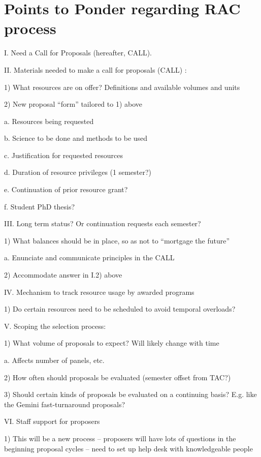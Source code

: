 \section{Points to Ponder regarding RAC process}


I.	Need a Call for Proposals (hereafter, CALL). 

II.	Materials needed to make a call for proposals (CALL) :


1)	What resources are on offer?  Definitions and available volumes and units


2)	New proposal “form” tailored to 1) above


a.	Resources being requested


b.	Science to be done  and methods to be used


c.	Justification for requested resources


d.	Duration of resource privileges  (1 semester?)


e.	Continuation of prior resource grant?


f.	Student PhD thesis?



III.	Long term status?  Or continuation requests each semester?


1)	What balances should be in place, so as not to “mortgage the future”


a.	Enunciate and communicate principles in the CALL


2)	Accommodate answer in I.2) above



IV.	Mechanism to track resource usage by awarded programs


1)	Do certain resources need to be scheduled to avoid temporal overloads?

V.	Scoping the selection process:


1)	What volume of proposals to expect?  Will likely change with time


a.	Affects number of panels, etc.


2)	How often should proposals be evaluated (semester offset from TAC?)


3)	Should certain kinds of proposals be evaluated on a continuing basis? E.g. like the Gemini fast-turnaround proposals?

VI.	Staff support for proposers 


1)	This will be a new process – proposers will have lots of questions in the beginning proposal cycles – need to set up help desk with knowledgeable people



